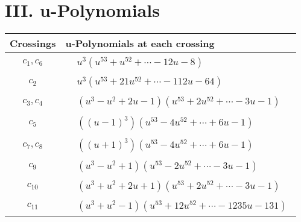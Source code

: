 \documentclass[1p]{elsarticle_modified}
\theoremstyle{definition}
\begin{document}
\newpage\renewcommand{\arraystretch}{1}
\centering \section*{ III. u-Polynomials}
\begin{tabular}{m{50pt}|m{274pt}}
Crossings & \hspace{64pt}u-Polynomials at each crossing \\
\hline $$\begin{aligned}c_{1},c_{6}\end{aligned}$$&$\begin{aligned}
&u^3(u^{53}+u^{52}+\cdots-12 u-8)
\end{aligned}$\\
\hline $$\begin{aligned}c_{2}\end{aligned}$$&$\begin{aligned}
&u^3(u^{53}+21 u^{52}+\cdots-112 u-64)
\end{aligned}$\\
\hline $$\begin{aligned}c_{3},c_{4}\end{aligned}$$&$\begin{aligned}
&(u^3- u^2+2 u-1)(u^{53}+2 u^{52}+\cdots-3 u-1)
\end{aligned}$\\
\hline $$\begin{aligned}c_{5}\end{aligned}$$&$\begin{aligned}
&((u-1)^3)(u^{53}-4 u^{52}+\cdots+6 u-1)
\end{aligned}$\\
\hline $$\begin{aligned}c_{7},c_{8}\end{aligned}$$&$\begin{aligned}
&((u+1)^3)(u^{53}-4 u^{52}+\cdots+6 u-1)
\end{aligned}$\\
\hline $$\begin{aligned}c_{9}\end{aligned}$$&$\begin{aligned}
&(u^3- u^2+1)(u^{53}-2 u^{52}+\cdots-3 u-1)
\end{aligned}$\\
\hline $$\begin{aligned}c_{10}\end{aligned}$$&$\begin{aligned}
&(u^3+u^2+2 u+1)(u^{53}+2 u^{52}+\cdots-3 u-1)
\end{aligned}$\\
\hline $$\begin{aligned}c_{11}\end{aligned}$$&$\begin{aligned}
&(u^3+u^2-1)(u^{53}+12 u^{52}+\cdots-1235 u-131)
\end{aligned}$\\
\hline
\end{tabular}\newpage\renewcommand{\arraystretch}{1}
\end{document}
